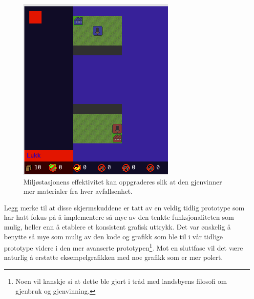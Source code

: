 \begin{figure} [H]
\centering
\includegraphics[scale=0.7]{images/OppgradereEnv.png}
\caption{Miljøstasjonens effektivitet kan oppgraderes slik at den gjenvinner mer materialer fra hver avfallsenhet.}
\label{fig:OppgradereEnv}
\end{figure}

Legg merke til at disse skjermskuddene er tatt av en veldig tidlig
prototype som har hatt fokus på å implementere så mye av den tenkte
funksjonaliteten som mulig, heller enn å etablere et konsistent grafisk
uttrykk. Det var ønskelig å benytte så mye som mulig av den kode og
grafikk som ble til i vår tidlige prototype videre i den mer avanserte
prototypen\footnote{Noen vil kanskje si at dette ble gjort i tråd med
landsbyens filosofi om gjenbruk og gjenvinning.}. Mot en sluttfase vil
det være naturlig å erstatte eksempelgrafikken med noe grafikk som er
mer polert.

